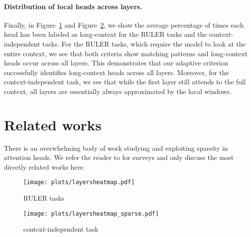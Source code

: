 \paragraph{Distribution of local heads across layers.}
Finally, in Figure~\ref{fig:heatmap} and Figure~\ref{fig:heatmap_independent}, we show the average percentage of times each head has been labeled as long-context for the RULER tasks and the context-independent tasks. For the RULER tasks, which require the model to look at the entire context, we see that both criteria show matching patterns and long-context heads occur across all layers. This demonstrates that our adaptive criterion successfully identifies long-context heads across all layers. Moreover, for the context-independent task, we see that while the first layer still attends to the full context, all layers are essentially always approximated by the local windows.


  










\section{Related works}
\label{sec:relatedworks}
There is an overwhelming body of work studying and exploiting sparsity in attention heads. We refer the reader to \citep{wan2023efficient,zheng2024attention} for surveys and only discuss the most directly related works here. 


\begin{figure*}
    \centering    
        \begin{subfigure}[b]{0.49\linewidth}
        \centering
\texttt{[image: plots/layersheatmap.pdf]}
        \caption{RULER tasks}
        \label{fig:heatmap}
    \end{subfigure}
        \begin{subfigure}[b]{0.49\linewidth}
        \centering
\texttt{[image: plots/layersheatmap\_sparse.pdf]}
        \caption{context-independent task}
        \label{fig:heatmap_independent}
    \end{subfigure}
    \caption{\small  We show for both the oracle adaptive and the adaptive criterion the \% of times each head has been labeled as long-context head averaged over a) the six RULER 8k tasks with  $\thrsoracle=\thrsapprox=0.6$ and b) the context-independent task based on the ``qa-2'' task from RULER.} 
    \label{fig:heatmaps}
\end{figure*}

